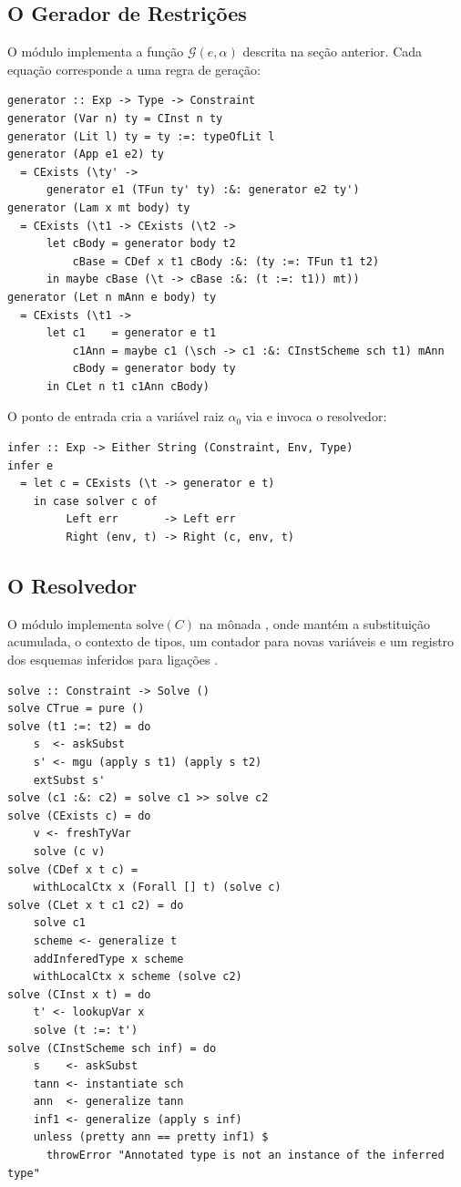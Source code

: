   \subsection{O Gerador de Restrições}

  O módulo  implementa a
  função \(\mathcal{G}(e, \alpha)\) descrita na seção anterior. Cada
  equação corresponde a uma regra de geração:

\begin{verbatim}
generator :: Exp -> Type -> Constraint
generator (Var n) ty = CInst n ty
generator (Lit l) ty = ty :=: typeOfLit l
generator (App e1 e2) ty
  = CExists (\ty' ->
      generator e1 (TFun ty' ty) :&: generator e2 ty')
generator (Lam x mt body) ty
  = CExists (\t1 -> CExists (\t2 ->
      let cBody = generator body t2
          cBase = CDef x t1 cBody :&: (ty :=: TFun t1 t2)
      in maybe cBase (\t -> cBase :&: (t :=: t1)) mt))
generator (Let n mAnn e body) ty
  = CExists (\t1 ->
      let c1    = generator e t1
          c1Ann = maybe c1 (\sch -> c1 :&: CInstScheme sch t1) mAnn
          cBody = generator body ty
      in CLet n t1 c1Ann cBody)
\end{verbatim}

  O ponto de entrada cria a variável raiz \(\alpha_0\) via
   e invoca o resolvedor:

\begin{verbatim}
infer :: Exp -> Either String (Constraint, Env, Type)
infer e
  = let c = CExists (\t -> generator e t)
    in case solver c of
         Left err       -> Left err
         Right (env, t) -> Right (c, env, t)
\end{verbatim}

  \subsection{O Resolvedor}

  O módulo  implementa
  \(\mathrm{solve}(C)\) na mônada , onde 
  mantém a substituição acumulada, o contexto de tipos, um contador
  para novas variáveis e um registro dos esquemas inferidos para
  ligações .

\begin{verbatim}
solve :: Constraint -> Solve ()
solve CTrue = pure ()
solve (t1 :=: t2) = do
    s  <- askSubst
    s' <- mgu (apply s t1) (apply s t2)
    extSubst s'
solve (c1 :&: c2) = solve c1 >> solve c2
solve (CExists c) = do
    v <- freshTyVar
    solve (c v)
solve (CDef x t c) =
    withLocalCtx x (Forall [] t) (solve c)
solve (CLet x t c1 c2) = do
    solve c1
    scheme <- generalize t
    addInferedType x scheme
    withLocalCtx x scheme (solve c2)
solve (CInst x t) = do
    t' <- lookupVar x
    solve (t :=: t')
solve (CInstScheme sch inf) = do
    s    <- askSubst
    tann <- instantiate sch
    ann  <- generalize tann
    inf1 <- generalize (apply s inf)
    unless (pretty ann == pretty inf1) $
      throwError "Annotated type is not an instance of the inferred type"
\end{verbatim}

